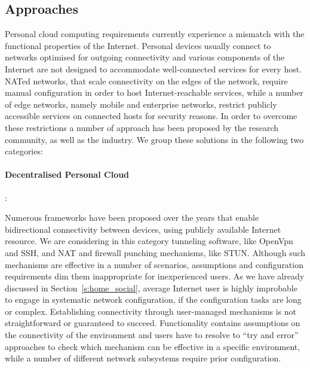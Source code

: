 \subsection{Approaches} 


Personal cloud computing requirements currently experience a mismatch with the
functional properties of the Internet.  Personal devices usually connect to networks
optimised for outgoing connectivity and various components of the
Internet are not designed to accommodate well-connected services for every host.
NATed networks, that scale connectivity on the edges of the network, require
manual configuration in order to host Internet-reachable services, while a
number of edge networks, namely mobile and enterprise networks, restrict
publicly accessible services on connected hosts for security reasons. In order
to overcome these restrictions a number of approach has been proposed by the
research community, as well as the industry.  We group these solutions in the
following two categories:

\paragraph*{Decentralised Personal Cloud}: 

Numerous frameworks have been proposed over the years that enable bidirectional
connectivity between devices, using publicly available Internet resource. We are
considering in this category tunneling software, like OpenVpn and SSH, and NAT
and firewall punching mechanisms, like STUN. Although such mechanisms are
effective in a number of scenarios, assumptions and configuration requirements
dim them inappropriate for inexperienced users. As we have already discussed in
Section~\ref{s:home_social}, average Internet user is highly improbable to
engage in systematic network configuration, if the configuration tasks are long
or complex. Establishing connectivity through user-managed mechanisms is not
straightforward or guaranteed to succeed. Functionality contains assumptions on the connectivity of the
environment and users have to resolve to ``try and error'' approaches to check
which mechanism can be effective in a specific environment, while a number of
different network subsystems require prior configuration. 

